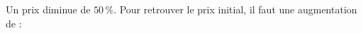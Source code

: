 
Un prix diminue de $50\,\%$. Pour retrouver le prix initial, il faut une augmentation de :

\smallskip

